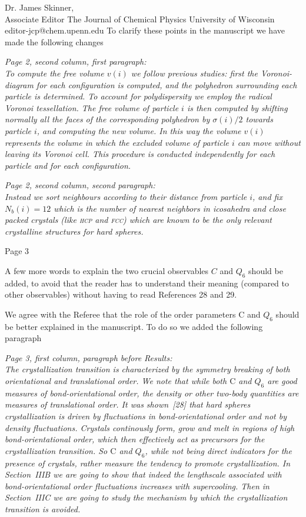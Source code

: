 \documentclass[a4paper, rebuttal, parskip=true, firsthead=false, fromemail=false, foldmarks=false]{scrlttr2}
\begin{document}
\begin{letter}{Dr. James Skinner,\\Associate Editor
The Journal of Chemical Physics
University of Wisconsin\\
editor-jcp@chem.upenn.edu }
To clarify these points in the manuscript we have made the following changes

{\it Page 2, second column, first paragraph:\\
To compute the free volume $v(i)$ we follow previous
studies: first the Voronoi-diagram for each configuration is computed, and the polyhedron
surrounding each particle is determined. To account for polydispersity we employ the radical Voronoi tessellation.
The free volume of particle $i$ is then
computed by shifting normally all the faces of the corresponding polyhedron by $\sigma(i)/2$
towards particle $i$, and computing the new volume. In this way
the volume $v(i)$ represents the volume in which the excluded volume of particle $i$ can move without leaving its Voronoi cell.
This procedure is conducted independently
for each particle and for each configuration.
}

{\it Page 2, second column, second paragraph:\\
Instead we
sort neighbours according to their distance from particle $i$, and
fix $N_b(i)=12$ which is the number of nearest neighbors in icosahedra and close packed crystals (like \textsc{hcp} and \textsc{fcc})
which are known to be the only relevant crystalline structures for hard spheres.
}


\begin{quotationi}
Page 3

A few more words to explain the two crucial observables $C$ and $Q_6$ should be added, to avoid that the reader has to understand their meaning (compared to other observables) without having to read References 28 and 29.
\end{quotationi}

We agree with the Referee that the role of the order parameters $\text{C}$ and $Q_6$ should be better explained in the manuscript. To do so we added the following
paragraph

{\it Page 3, first column, paragraph before Results:\\
The crystallization transition is characterized by
the symmetry breaking of both orientational and translational order.
We note that while both $\text{C}$ and $Q_6$ are good measures of bond-orientational order, the density or other two-body
quantities are measures of translational order.  It was shown~[28] that hard spheres crystallization is
driven by fluctuations in bond-orientational order and not by density fluctuations. Crystals continously form, grow and melt
in regions of high bond-orientational order, which then effectively act as precursors for the crystallization transition.
So $\text{C}$ and $Q_6$, while not
being direct indicators for the presence of crystals, rather measure the tendency to promote crystallization. In Section~IIIB we are going to show
that indeed the lengthscale associated with bond-orientational order fluctuations increases with supercooling. Then in Section~IIIC we are going to study
the mechanism by which the crystallization transition is avoided.
}


\end{letter}
\end{document}
